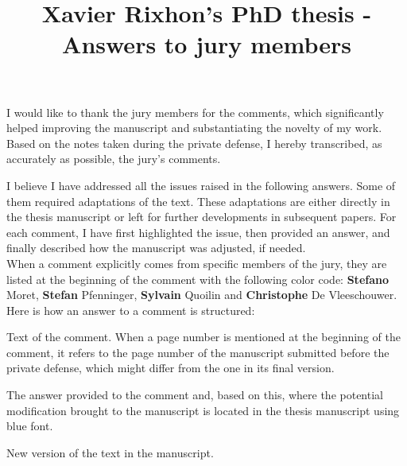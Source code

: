 \documentclass[12pt,a4paper]{article}
\title{\vspace{-1cm}
\begin{flushleft} {\sffamily Xavier Rixhon's PhD thesis - Answers to jury members}\end{flushleft}}
\date{\vspace{-1.7cm}\begin{flushleft}\sffamily Exploration of uncertainty-aware energy transition pathways - Reinforcement learning and principal component analysis-based methods\end{flushleft}}
\newcommand{\clearemptydoublepage}{\newpage{\pagestyle{empty}\cleardoublepage}} %
\begin{document}
\maketitle

I would like to thank the jury members for the comments, which significantly helped improving the manuscript and substantiating the novelty of my work. Based on the notes taken during the private defense, I hereby transcribed, as accurately as possible, the jury's comments. 

I believe I have addressed all the issues raised in the following answers. Some of them required adaptations of the text. These adaptations are either directly in the thesis manuscript or left for further developments in subsequent papers. For each comment, I have first highlighted the issue, then provided an answer, and finally described how the manuscript was adjusted, if needed.\\

When a comment explicitly comes from specific members of the jury, they are listed at the beginning of the comment with the following color code: {\color{orange} \textbf{Stefano} Moret}, {\color{teal} \textbf{Stefan} Pfenninger}, {\color{purple} \textbf{Sylvain} Quoilin} and {\color{violet} \textbf{Christophe} De Vleeschouwer}. Here is how an answer to a comment is structured:

\begin{mdframed}[style=comment] %
Text of the comment. When a page number is mentioned at the beginning of the comment, it refers to the page number of the manuscript submitted before the private defense, which might differ from the one in its final version.
\end{mdframed}

\noindent The answer provided to the comment and, based on this, where the potential modification brought to the manuscript is located in the thesis manuscript using {\color{blue} blue font}.

\begin{mdframed}[style=manuscript] %
New version of the text in the manuscript.
\end{mdframed}


\clearpage
%
\end{document}
